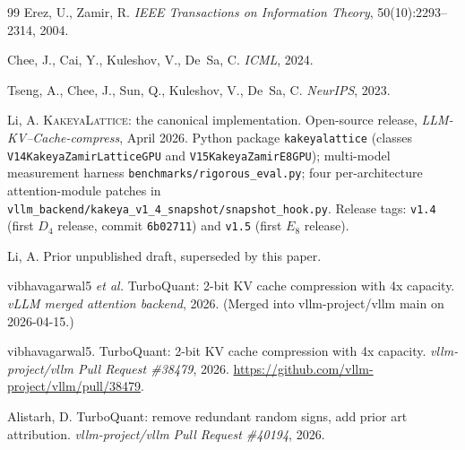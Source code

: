 \documentclass[10pt,a4paper]{article}
\theoremstyle{definition}
\theoremstyle{plain}
\begin{document}
\begin{thebibliography}{99}
Erez, U., Zamir, R.
\newblock \emph{IEEE Transactions on Information Theory}, 50(10):2293--2314, 2004.

Chee, J., Cai, Y., Kuleshov, V., De~Sa, C.
\newblock \emph{ICML}, 2024.

Tseng, A., Chee, J., Sun, Q., Kuleshov, V., De~Sa, C.
\newblock \emph{NeurIPS}, 2023.


Li, A.
\newblock \textsc{KakeyaLattice}: the canonical implementation.
\newblock Open-source release, \emph{LLM-KV--Cache-compress},
  April 2026.
\newblock Python package \texttt{kakeyalattice} (classes
  \texttt{V14KakeyaZamirLatticeGPU} and
  \texttt{V15KakeyaZamirE8GPU}); multi-model measurement harness
  \texttt{benchmarks/rigorous\_eval.py}; four per-architecture
  attention-module patches in
  \texttt{vllm\_backend/kakeya\_v1\_4\_snapshot/snapshot\_hook.py}.
  Release tags: \texttt{v1.4} (first $D_4$ release, commit
  \texttt{6b02711}) and \texttt{v1.5} (first $E_8$ release).

Li, A.
\newblock Prior unpublished draft, superseded by this paper.

vibhavagarwal5 \emph{et al.}
\newblock TurboQuant: 2-bit KV cache compression with 4x capacity.
\newblock \emph{vLLM merged attention backend}, 2026.
\newblock (Merged into vllm-project/vllm main on 2026-04-15.)

vibhavagarwal5.
 TurboQuant: 2-bit KV cache compression with 4x capacity.
\newblock \emph{vllm-project/vllm Pull Request \#38479}, 2026.
\newblock \url{https://github.com/vllm-project/vllm/pull/38479}.

Alistarh, D.
\newblock [Attention] TurboQuant: remove redundant random signs, add prior art attribution.
\newblock \emph{vllm-project/vllm Pull Request \#40194}, 2026.


\end{thebibliography}
\end{document}
